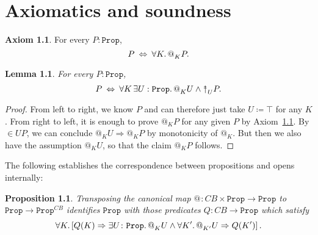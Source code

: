 \documentclass[11pt, oneside, article]{memoir}
\makeatletter
\theoremstyle{plain}
\newtheorem{proposition}[theorem]{Proposition}
\newtheorem{lemma}[theorem]{Lemma}
\theoremstyle{definition}
\newtheorem{axiom}{Axiom}
\theoremstyle{remark}
\newcommand{\const}[1]{\mathtt{#1}}
\newcommand{\Prop}{\const{Prop}}
\newcommand{\BaseSpace}{B}
\newcommand{\AtSymbol}{{@}}
\newcommand{\InSymbol}{{\upclose}}%
\newcommand{\At}[2][]{\AtSymbol^{#1}_{#2}}
\newcommand{\In}[2][]{\InSymbol^{#1}_{#2}}
\newcommand{\upclose}{{\rotatebox[origin=c]{90}{$\twoheadrightarrow$}}}
\newcommand{\imp}{\Rightarrow}
\makeatother
\begin{document}


\chapter{Axiomatics and soundness}


\begin{axiom}\label{ax.enough_points}
For every $P : \Prop$,
\[
	P \: \Leftrightarrow \: \forall K \ldotp \At{K} P.
\]
\end{axiom}

\begin{lemma}
For every $P : \Prop$,
\[
	P \: \Leftrightarrow \: \forall K \, \exists U : \Prop \ldotp \At{K} U \wedge \In{U} P.
\]
\label{lem.prop_to_opens}
\end{lemma}

\begin{proof}
From left to right, we know $P$ and can therefore just take $U \coloneqq \top$ for any $K$. From right to left, it is enough to prove $\At{K} P$ for any given $P$ by Axiom~\ref{ax.enough_points}. By $\in{U}P$, we can conclude $\At{K} U \imp \At{K} P$ by monotonicity of $\At{K}$. But then we also have the assumption $\At{K} U$, so that the claim $\At{K} P$ follows.
\end{proof}

The following establishes the correspondence between propositions and opens internally:

\begin{proposition}\label{prop:prop_as_opens}
Transposing the canonical map $\At{} : C\BaseSpace \times \Prop \to \Prop$ to $\Prop \to \Prop^{C\BaseSpace}$ identifies $\Prop$ with those predicates $Q : C\BaseSpace \to \Prop$ which satisfy
\[
	\forall K \ldotp \left[ Q(K) \imp \exists U \colon \Prop \ldotp \At{K} U \wedge \forall K' \ldotp \At{K'} U \imp Q(K') \right].
\]
\end{proposition}
\end{document}
